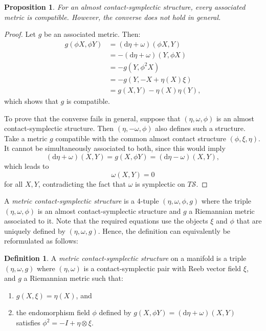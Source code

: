 \documentclass[12pt]{amsart}
\newtheorem{proposition}[theorem]{Proposition}
\theoremstyle{definition}
\newtheorem{definition}[theorem]{Definition}
\theoremstyle{remark}
\begin{document}
 \begin{proposition}
For an almost contact-symplectic structure, every associated metric is compatible.
However, the converse does not hold in general.
 \end{proposition}
 \begin{proof}
Let $g$ be an associated metric. Then:
 \begin{align*}
g(\phi X,\phi Y)&=(\mathrm{d}\eta +\omega)(\phi X,Y) \\
			&=-(\mathrm{d}\eta +\omega)(Y, \phi X) \\
			&=-g(Y,\phi^2X) \\
			&=-g(Y,-X+\eta(X)\xi)\\
			&=g(X,Y)-\eta(X)\eta(Y),
\end{align*}
which shows that $g$ is compatible.

\medskip 
\noindent
To prove that the converse fails in general, suppose that  $(\eta, \omega, \phi)$  is an almost contact-symplectic structure.
Then $(\eta, - \omega, \phi)$ also defines such a structure.
Take a metric $g$ compatible with the common almost contact structure $( \phi, \xi, \eta)$. It cannot be simultaneously associated to both, since this would imply
 \begin{equation*}
(\mathrm{d}\eta+\omega)(X,Y)=g(X,\phi Y)=(\mathrm{d}\eta-\omega)(X,Y), 
\end{equation*}
which leads to 
 \begin{equation*}
\omega(X,Y) = 0
 \end{equation*}
 for all $X, Y$, contradicting the fact that $\omega$ is symplectic on $T\mathcal{S}$.
 \end{proof}

\noindent
A \emph{metric contact-symplectic structure} is a 4-tuple $(\eta, \omega, \phi, g)$ where the triple $(\eta, \omega, \phi)$ is an almost contact-symplectic structure and $g$ a Riemannian metric associated to it.
Note that  the required equations use the objects $\xi$ and $\phi$ that are uniquely defined by $(\eta, \omega, g)$.
Hence, the definition can equivalently be reformulated as follows:

\begin{definition}
A \emph{metric contact-symplectic structure}  on a manifold is a triple $(\eta, \omega, g)$ where $(\eta, \omega)$ is a contact-symplectic pair with Reeb vector field $\xi$, and $g$ a Riemannian metric such that:
\begin{enumerate}[label=(\roman*)]
\item $g(X,\xi)=\eta (X)$, and
\item the endomorphism field $\phi$ defined by $g(X,\phi Y)=(\mathrm{d}\eta +\omega)(X,Y)$ satisfies $\phi^2=-I +\eta \otimes \xi$.
\end{enumerate}
\end{definition}
\end{document}

